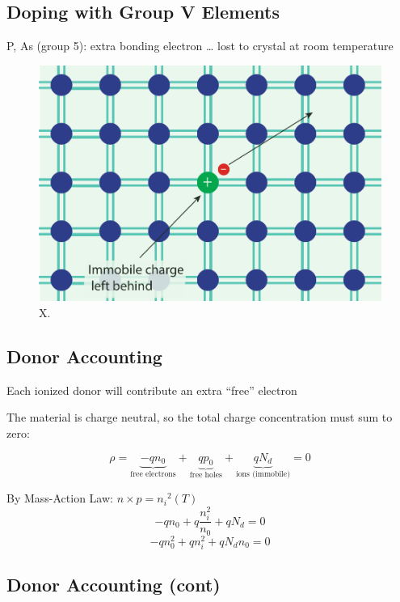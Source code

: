 \subsection{Doping with Group V Elements}

 P, As (group 5): extra bonding electron … lost to crystal at room temperature



\begin{figure}
\begin{center}
\includegraphics[width=.5\columnwidth]{silicon_dopant_V}
\end{center}
\caption{X. } \label{fig:silicon_dopant_V}
\end{figure}




\subsection{Donor Accounting}

 Each ionized donor will contribute an extra “free” electron

 The material is charge neutral, so the total charge concentration must sum to zero:


\begin{equation}
	\rho  =  \underbrace{- q{n_0}}_{\text{free electrons}} 
	+ \underbrace{q{p_0}}_{\text{free holes}} + 
	\underbrace{q{N_d}}_{\text{ions (immobile)}}  = 0
\end{equation}


 By Mass-Action Law:  $n \times p = {n_i}^2(T)$
\begin{equation}
	 - q{n_0} + q\frac{{n_i^2}}{{{n_0}}} + q{N_d} = 0
\end{equation}
\begin{equation}
 - qn_0^2 + qn_i^2 + q{N_d}{n_0} = 0
\end{equation}






\subsection{Donor Accounting (cont)}


